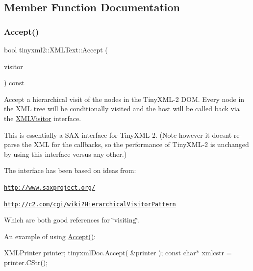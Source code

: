 \subsection{Member Function Documentation}
\mbox{\label{classtinyxml2_1_1_x_m_l_text_a537c60d7e18fb59c45ac2737a29ac47a}} 
\subsubsection{\texorpdfstring{Accept()}{Accept()}}
{\footnotesize\ttfamily bool tinyxml2\+::\+X\+M\+L\+Text\+::\+Accept (\begin{DoxyParamCaption}\item[{\mbox{\hyperlink{classtinyxml2_1_1_x_m_l_visitor}{X\+M\+L\+Visitor}} $\ast$}]{visitor }\end{DoxyParamCaption}) const\hspace{0.3cm}{\ttfamily [virtual]}}

Accept a hierarchical visit of the nodes in the Tiny\+X\+M\+L-\/2 D\+OM. Every node in the X\+ML tree will be conditionally visited and the host will be called back via the \mbox{\hyperlink{classtinyxml2_1_1_x_m_l_visitor}{X\+M\+L\+Visitor}} interface.

This is essentially a S\+AX interface for Tiny\+X\+M\+L-\/2. (Note however it doesn\textquotesingle{}t re-\/parse the X\+ML for the callbacks, so the performance of Tiny\+X\+M\+L-\/2 is unchanged by using this interface versus any other.)

The interface has been based on ideas from\+:


\begin{DoxyItemize}
\item \href{http://www.saxproject.org/}{\tt http\+://www.\+saxproject.\+org/}
\item \href{http://c2.com/cgi/wiki?HierarchicalVisitorPattern}{\tt http\+://c2.\+com/cgi/wiki?\+Hierarchical\+Visitor\+Pattern}
\end{DoxyItemize}

Which are both good references for \char`\"{}visiting\char`\"{}.

An example of using \mbox{\hyperlink{classtinyxml2_1_1_x_m_l_text_a537c60d7e18fb59c45ac2737a29ac47a}{Accept()}}\+: \begin{DoxyVerb}XMLPrinter printer;
tinyxmlDoc.Accept( &printer );
const char* xmlcstr = printer.CStr();
\end{DoxyVerb}
 

